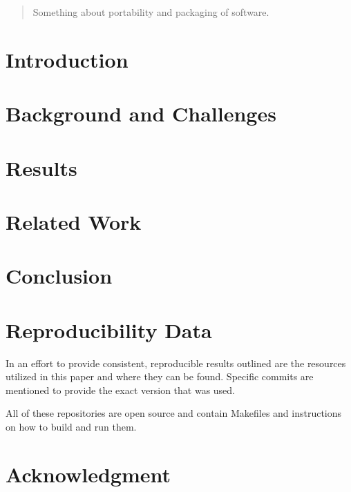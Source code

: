 \documentclass[conference]{IEEEtran}
\begin{document}
\title{}



\author{
\and
{}
}


\maketitle

\begin{abstract}
Something about portability and packaging of software.
\end{abstract}



\section{Introduction}


\section{Background and Challenges}

\section{Results}

\section{Related Work}

\section{Conclusion}

\section{Reproducibility Data}

In an effort to provide consistent, reproducible results outlined are the
resources utilized in this paper and where they can be found.
Specific commits are mentioned to provide the exact version that was used.


All of these repositories are open source and contain Makefiles
and instructions on how to build and run them.



\section*{Acknowledgment}




\end{document}
